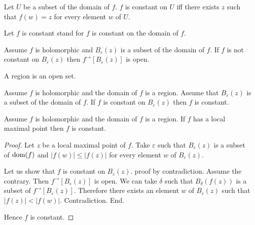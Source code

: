 \documentclass{article}
\newcommand{\Ball}[2]{B_{#1}(#2)}
\newcommand{\image}[2]{#1^{\to}[#2]}
\begin{document}
\begin{forthel}
    \begin{definition}
      Let $U$ be a subset of the domain of $f$. $f$ is constant on $U$ iff there exists $z$ such that $f(w) = z$ for every element $w$ of $U$.
    \end{definition}

    Let $f$ is constant stand for $f$ is constant on the domain of $f$.

    \begin{axiom}
      Assume $f$ is holomorphic and $\Ball{\varepsilon}{z}$ is a subset of the domain of $f$.
      If $f$ is not constant on $\Ball{\varepsilon}{z}$
        then $\image{f}{\Ball{\varepsilon}{z}}$ is open.
    \end{axiom}

    \begin{signature}
      A region is an open set.
    \end{signature}

    \begin{axiom}[IdentityTheorem]
      Assume $f$ is holomorphic and the domain of $f$ is a region.
      Assume that $\Ball{\varepsilon}{z}$ is a subset of the domain of $f$.
      If $f$ is constant on $\Ball{\varepsilon}{z}$ then $f$ is constant.
    \end{axiom}

    \begin{proposition}[Maximumprinciple]
      Assume $f$ is holomorphic and the domain of $f$ is a region.
      If $f$ has a local maximal point then $f$ is constant.
    \end{proposition}
    \begin{proof}
      Let $z$ be a local maximal point of $f$.
      Take $\varepsilon$ such that
        $\Ball{\varepsilon}{z}$ is a subset of $\operatorname{dom}(f)$
        and $|f(w)| \leq |f(z)|$ for every element $w$ of $\Ball{\varepsilon}{z}$.

      Let us show that $f$ is constant on $\Ball{\varepsilon}{z}$.
      proof by contradiction.
        Assume the contrary.
        Then $\image{f}{\Ball{\varepsilon}{z}}$ is open.
        We can take $\delta$ such that
          $\Ball{\delta}{f(z)}$ is a subset of $\image{f}{\Ball{\varepsilon}{z}}$.
        Therefore there exists an element $w$ of $\Ball{\varepsilon}{z}$ such that
          $|f(z)| < |f(w)|$. Contradiction.
    	End.

      Hence $f$ is constant.
    \end{proof}
  \end{forthel}
\end{document}
